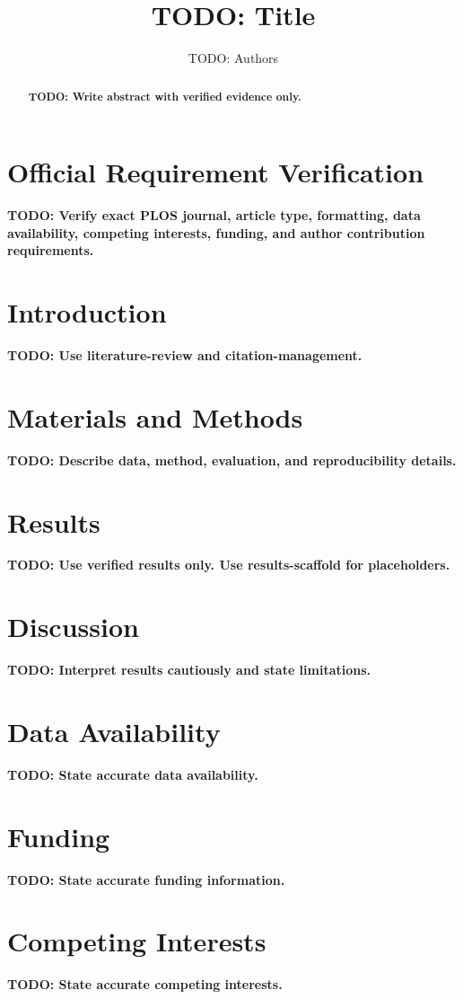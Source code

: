 \documentclass[11pt]{article}
\title{TODO: Title}
\author{TODO: Authors}
\date{}
\newcommand{\todo}[1]{\textbf{TODO: #1}}
\begin{document}
\maketitle

\section*{Official Requirement Verification}

\todo{Verify exact PLOS journal, article type, formatting, data availability, competing interests, funding, and author contribution requirements.}

\begin{abstract}
\todo{Write abstract with verified evidence only.}
\end{abstract}

\section{Introduction}
\todo{Use literature-review and citation-management.}

\section{Materials and Methods}
\todo{Describe data, method, evaluation, and reproducibility details.}

\section{Results}
\todo{Use verified results only. Use results-scaffold for placeholders.}

\section{Discussion}
\todo{Interpret results cautiously and state limitations.}

\section*{Data Availability}
\todo{State accurate data availability.}

\section*{Funding}
\todo{State accurate funding information.}

\section*{Competing Interests}
\todo{State accurate competing interests.}


% 
\end{document}
